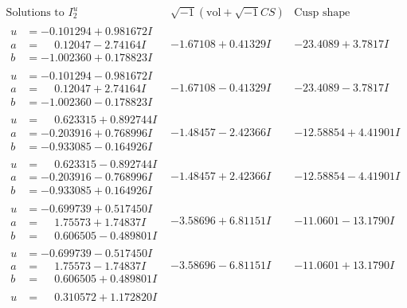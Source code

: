 \documentclass[1p]{elsarticle_modified}
\theoremstyle{definition}
\newcommand{\I}{\sqrt{-1}}
\begin{document}
$$\begin{array}{c|c|c}  
\text{Solutions to }I^u_{2}& \I (\text{vol} + \sqrt{-1}CS) & \text{Cusp shape}\\
 \hline 
\begin{aligned}
u &= -0.101294 + 0.981672 I \\
a &= \phantom{-}0.12047 - 2.74164 I \\
b &= -1.002360 + 0.178823 I\end{aligned}
 & -1.67108 + 0.41329 I & -23.4089 + 3.7817 I \\ \hline\begin{aligned}
u &= -0.101294 - 0.981672 I \\
a &= \phantom{-}0.12047 + 2.74164 I \\
b &= -1.002360 - 0.178823 I\end{aligned}
 & -1.67108 - 0.41329 I & -23.4089 - 3.7817 I \\ \hline\begin{aligned}
u &= \phantom{-}0.623315 + 0.892744 I \\
a &= -0.203916 + 0.768996 I \\
b &= -0.933085 - 0.164926 I\end{aligned}
 & -1.48457 - 2.42366 I & -12.58854 + 4.41901 I \\ \hline\begin{aligned}
u &= \phantom{-}0.623315 - 0.892744 I \\
a &= -0.203916 - 0.768996 I \\
b &= -0.933085 + 0.164926 I\end{aligned}
 & -1.48457 + 2.42366 I & -12.58854 - 4.41901 I \\ \hline\begin{aligned}
u &= -0.699739 + 0.517450 I \\
a &= \phantom{-}1.75573 + 1.74837 I \\
b &= \phantom{-}0.606505 - 0.489801 I\end{aligned}
 & -3.58696 + 6.81151 I & -11.0601 - 13.1790 I \\ \hline\begin{aligned}
u &= -0.699739 - 0.517450 I \\
a &= \phantom{-}1.75573 - 1.74837 I \\
b &= \phantom{-}0.606505 + 0.489801 I\end{aligned}
 & -3.58696 - 6.81151 I & -11.0601 + 13.1790 I \\ \hline\begin{aligned}
u &= \phantom{-}0.310572 + 1.172820 I \\

\end{aligned}
\end{array}$$
\end{document}
